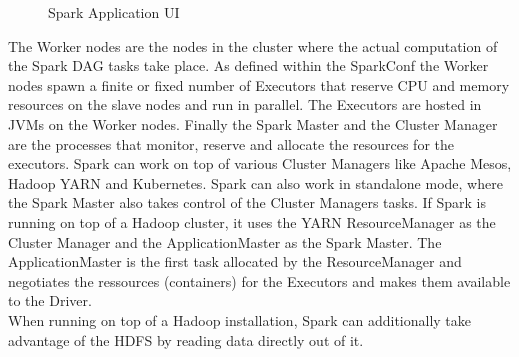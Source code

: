 \begin{figure}[htbp]
	\captionsetup[subfigure]{justification=centering}
	\centering
	\caption{Spark Application UI}
	\label{appui}
\end{figure}
\FloatBarrier

\noindent The Worker nodes are the nodes in the cluster where the actual computation of the Spark DAG tasks take place. As defined within the SparkConf the Worker nodes spawn a finite or fixed number of Executors that reserve CPU and memory resources on the slave nodes and run in parallel. The Executors are hosted in JVMs on the Worker nodes. Finally the Spark Master and the Cluster Manager are the processes that monitor, reserve and allocate the resources for the executors. Spark can work on top of various Cluster Managers like Apache Mesos, Hadoop YARN and Kubernetes. Spark can also work in standalone mode, where the Spark Master also takes control of the Cluster Managers tasks. If Spark is running on top of a Hadoop cluster, it uses the YARN ResourceManager as the Cluster Manager and the ApplicationMaster as the Spark Master. The ApplicationMaster is the first task allocated by the ResourceManager and negotiates the ressources (containers) for the Executors and makes them available to the Driver. \cite[pp. 49 ff]{sparkbook1}\\
When running on top of a Hadoop installation, Spark can additionally take advantage of the HDFS by reading data directly out of it.\\

